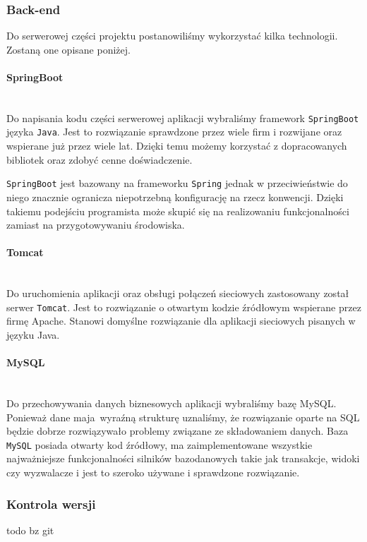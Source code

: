 \documentclass{article}
\begin{document}
	\subsubsection{Back-end}	
	Do serwerowej części projektu postanowiliśmy wykorzystać kilka technologii. Zostaną one opisane poniżej.
	  
	\paragraph{SpringBoot} \mbox{} \\
	Do napisania kodu części serwerowej aplikacji wybraliśmy framework \texttt{SpringBoot} języka \texttt{Java}.
	Jest to rozwiązanie sprawdzone przez wiele firm i rozwijane oraz wspierane już przez wiele lat. Dzięki temu możemy korzystać z dopracowanych bibliotek oraz zdobyć cenne doświadczenie.

	\texttt{SpringBoot} jest bazowany na frameworku \texttt{Spring} jednak w przeciwieństwie do niego znacznie ogranicza niepotrzebną konfigurację na rzecz konwencji.
	Dzięki takiemu podejściu programista może skupić się na realizowaniu funkcjonalności zamiast na przygotowywaniu środowiska.

	\paragraph{Tomcat} \mbox{} \\
	Do uruchomienia aplikacji oraz obsługi połączeń sieciowych zastosowany został serwer \texttt{Tomcat}.
	Jest to rozwiązanie o otwartym kodzie źródłowym wspierane przez firmę Apache.
	Stanowi domyślne rozwiązanie dla aplikacji sieciowych pisanych w języku Java.

	\paragraph{MySQL} \mbox{} \\
	Do przechowywania danych biznesowych aplikacji wybraliśmy bazę MySQL.
	Ponieważ dane maja wyraźną strukturę uznaliśmy, że rozwiązanie oparte na SQL będzie dobrze rozwiązywało problemy związane ze składowaniem danych.
	Baza \texttt{MySQL} posiada otwarty kod źródłowy, ma zaimplementowane wszystkie najważniejsze funkcjonalności silników bazodanowych takie jak transakcje, widoki czy wyzwalacze i jest to szeroko używane i sprawdzone rozwiązanie.
	
	\subsubsection{Kontrola wersji}
	todo bz git
	  
\end{document}
